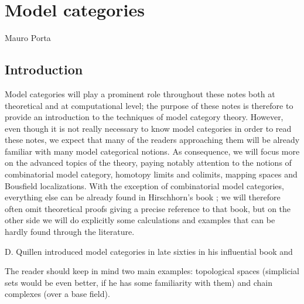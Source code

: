 \chapter{Model categories}

\begin{flushright}
Mauro Porta
\end{flushright}

\begin{refsection}

\section{Introduction}

Model categories will play a prominent role throughout these notes both at theoretical and at computational level; the purpose of these notes is therefore to provide an introduction to the techniques of model category theory. However, even though it is not really necessary to know model categories in order to read these notes, we expect that many of the readers approaching them will be already familiar with many model categorical notions. As consequence, we will focus more on the advanced topics of the theory, paying notably attention to the notions of combinatorial model category, homotopy limits and colimits, mapping spaces and Bousfield localizations. With the exception of combinatorial model categories, everything else can be already found in Hirschhorn's book \cite{hirschhorn}; we will therefore often omit theoretical proofs giving a precise reference to that book, but on the other side we will do explicitly some calculations and examples that can be hardly found through the literature.

D. Quillen introduced model categories in late sixties in his influential book \cite{quillen} and 

The reader should keep in mind two main examples: topological spaces (simplicial sets would be even better, if he has some familiarity with them) and chain complexes (over a base field).


\end{refsection}
